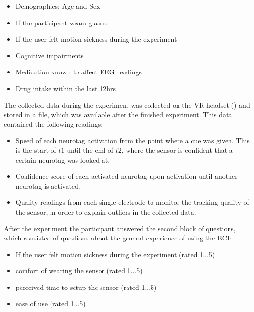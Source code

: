            \begin{itemize}
                \item Demographics: Age and Sex
                \item If the participant wears glasses
                \item If the user felt motion sickness during the experiment
                \item Cognitive impairments
                \item Medication known to affect EEG readings
                \item Drug intake within the last 12hrs
            \end{itemize}

            The collected data during the experiment was collected on the VR headset () and stored in a file, which was available after the finished experiment. This data contained the following readings:

            \begin{itemize}
                \item Speed of each neurotag activation from the point where a cue was given. This is the start of $t1$ until the end of $t2$, where the sensor is confident that a certain neurotag was looked at.
                \item Confidence score of each activated neurotag upon activation until another neurotag is activated.
                \item Quality readings from each single electrode to monitor the tracking quality of the sensor, in order to explain outliers in the collected data.
            \end{itemize}
            
            After the experiment the participant answered the second block of questions, which consisted of questions about the general experience of using the BCI:
            
            \begin{itemize}
                \item If the user felt motion sickness during the experiment (rated 1...5)
                \item comfort of wearing the sensor (rated 1...5)
                \item perceived time to setup the sensor (rated 1...5)
                \item ease of use (rated 1...5) %
            \end{itemize}           

